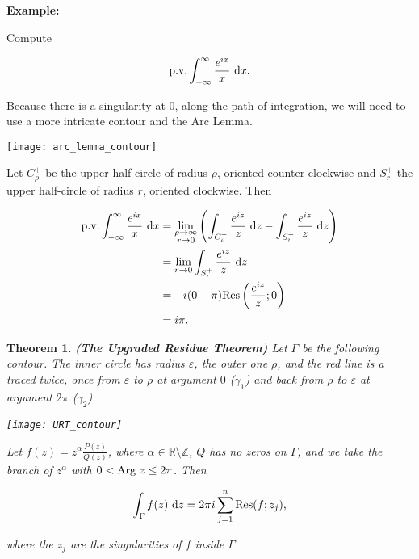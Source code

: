 \documentclass{article}
\theoremstyle{colontheorem}
\newtheorem{theorem}{Theorem}[section]
\newcommand{\Arg}{\textnormal{Arg }}
\newcommand{\Res}{\textnormal{Res}}
\newcommand{\pv}{\textnormal{p.v.}}
\newenvironment{Theorem}
{
	\begin{mdframed}[backgroundcolor=TheoremOrange!10]
	\begin{theorem}
}
{
	\end{theorem}
	\end{mdframed}
	
	\vspace{.15in}
}
\newenvironment{Example}
{
	\begin{mdframed}
	\textbf{Example:}%
}
{
	\end{mdframed}
	
	\vspace{.15in}
}
\begin{document}
\begin{Example}
	Compute
	
	$$
		\pv \int_{-\infty}^{\infty} \frac{e^{ix}}{x}\ \textnormal{d}x.
	$$
	
	Because there is a singularity at $0$, along the path of integration, we will need to use a more intricate contour and the Arc Lemma.
	
	\begin{center}
		
		\texttt{[image: arc\_lemma\_contour]}
		
	\end{center}
	
	Let $C_\rho^+$ be the upper half-circle of radius $\rho$, oriented counter-clockwise and $S_r^+$ the upper half-circle of radius $r$, oriented clockwise. Then
	
	\begin{align*}
		\pv \int_{-\infty}^{\infty} \frac{e^{ix}}{x}\ \textnormal{d}x &= \lim_{\substack{\rho \to \infty \\ r \to 0}} \left( \int_{C_\rho^+} \frac{e^{iz}}{z}\ \textnormal{d}z - \int_{S_r^+} \frac{e^{iz}}{z}\ \textnormal{d}z \right)\\
		&= \lim\limits_{r \to 0} \int_{S_r^+} \frac{e^{iz}}{z}\ \textnormal{d}z\\
		&= -i (0 - \pi) \Res \left( \frac{e^{iz}}{z}; 0 \right)\\
		&= i \pi.
	\end{align*}
	
\end{Example}



\begin{Theorem}
	
	\textbf{(The Upgraded Residue Theorem)} Let $\Gamma$ be the following contour. The inner circle has radius $\varepsilon$, the outer one $\rho$, and the red line is a traced twice, once from $\varepsilon$ to $\rho$ at argument $0$ ($\gamma_1$) and back from $\rho$ to $\varepsilon$ at argument $2\pi$ ($\gamma_2$).
	
	\begin{center}
		
		\texttt{[image: URT\_contour]}
		
	\end{center}
	
	Let $f(z) = z^\alpha \frac{P(z)}{Q(z)}$, where $\alpha \in \mathbb{R} \setminus \mathbb{Z}$, $Q$ has no zeros on $\Gamma$, and we take the branch of $z^\alpha$ with $0 < \Arg z \leq 2 \pi$. Then
	
	$$
		\int_\Gamma f(z)\ \textnormal{d}z = 2 \pi i \displaystyle\sum\limits_{j = 1}^n \Res(f; z_j)\textnormal{,}
	$$
	
	where the $z_j$ are the singularities of $f$ inside $\Gamma$.
	
\end{Theorem}
\end{document}
